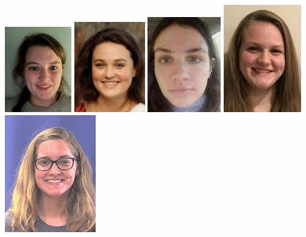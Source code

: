 \documentclass[xcolor={usenames,dvipsnames,svgnames,table},12pt]{beamer}
\begin{document}
\begin{frame}{}
\begin{center}
\includegraphics[width=\photosize]{S21/000573238.jpg}
\includegraphics[width=\photosize]{S21/000572628.jpg}
\includegraphics[width=\photosize]{S21/000572775.jpg}
\includegraphics[width=\photosize]{S21/000573692.jpg}
\includegraphics[width=\photosize]{S21/000565336.jpg}
  \end{center}
\end{frame}
\end{document}

